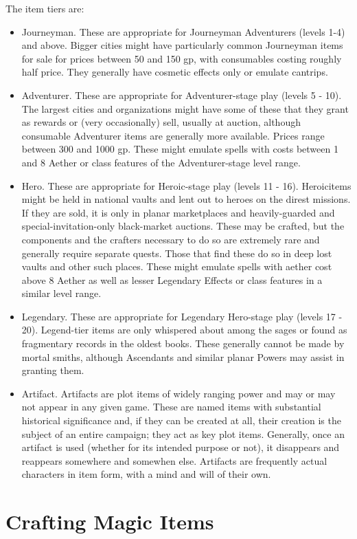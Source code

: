 The item tiers are:
\begin{itemize}
	\item Journeyman. These are appropriate for Journeyman Adventurers (levels 1-4) and above. Bigger cities might have particularly common Journeyman items for sale for prices between 50 and 150 gp, with consumables costing roughly half price. They generally have cosmetic effects only or emulate cantrips.
	\item Adventurer. These are appropriate for Adventurer-stage play (levels 5 - 10). The largest cities and organizations might have some of these that they grant as rewards or (very occasionally) sell, usually at auction, although consumable Adventurer  items are generally more available. Prices range between 300 and 1000 gp. These might emulate spells with costs between 1 and 8 Aether or class features of the Adventurer-stage level range.
	\item Hero. These are appropriate for Heroic-stage play (levels 11 - 16). Heroicitems might be held in national vaults and lent out to heroes on the direst missions. If they are sold, it is only in planar marketplaces and heavily-guarded and special-invitation-only black-market auctions. These may be crafted, but the components and the crafters necessary to do so are extremely rare and generally require separate quests. Those that find these do so in deep lost vaults and other such places. These might emulate spells with aether cost above 8 Aether as well as lesser Legendary Effects or class features in a similar level range.
	\item Legendary. These are appropriate for Legendary Hero-stage play (levels 17 - 20). Legend-tier items are only whispered about among the sages or found as fragmentary records in the oldest books. These generally cannot be made by mortal smiths, although Ascendants and similar planar Powers may assist in granting them.
	\item Artifact. Artifacts are plot items of widely ranging power and may or may not appear in any given game. These are named items with substantial historical significance and, if they can be created at all, their creation is the subject of an entire campaign; they act as key plot items. Generally, once an artifact is used (whether for its intended purpose or not), it disappears and reappears somewhere and somewhen else. Artifacts are frequently actual characters in item form, with a mind and will of their own.
\end{itemize}

\section{Crafting Magic Items}

